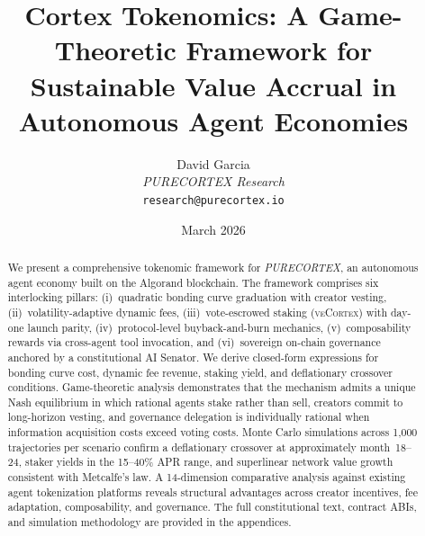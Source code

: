 \documentclass[11pt,letterpaper]{article}
\title{\textbf{Cortex Tokenomics: A Game-Theoretic Framework for\\
Sustainable Value Accrual in Autonomous Agent Economies}}
\author{David Garcia\\
\textit{PURECORTEX Research}\\
\texttt{research@purecortex.io}}
\date{March 2026}
\theoremstyle{definition}
\theoremstyle{remark}
\newcommand{\veCORTEX}{\textsc{veCortex}}
\begin{document}
\maketitle

\begin{abstract}
We present a comprehensive tokenomic framework for \emph{PURECORTEX}, an
autonomous agent economy built on the Algorand blockchain. The framework
comprises six interlocking pillars: (i)~quadratic bonding curve graduation
with creator vesting, (ii)~volatility-adaptive dynamic fees,
(iii)~vote-escrowed staking (\veCORTEX{}) with day-one launch parity,
(iv)~protocol-level buyback-and-burn mechanics, (v)~composability rewards
via cross-agent tool invocation, and (vi)~sovereign on-chain governance
anchored by a constitutional AI Senator. We derive closed-form expressions
for bonding curve cost, dynamic fee revenue, staking yield, and deflationary
crossover conditions. Game-theoretic analysis demonstrates that the mechanism
admits a unique Nash equilibrium in which rational agents stake rather than
sell, creators commit to long-horizon vesting, and governance delegation is
individually rational when information acquisition costs exceed voting costs.
Monte Carlo simulations across 1{,}000 trajectories per scenario confirm a
deflationary crossover at approximately month~18--24, staker yields in the
15--40\% APR range, and superlinear network value growth consistent with
Metcalfe's law. A 14-dimension comparative analysis against existing agent
tokenization platforms reveals structural advantages across creator
incentives, fee adaptation, composability, and governance. The full
constitutional text, contract ABIs, and simulation methodology are provided
in the appendices.
\end{abstract}

\tableofcontents
\newpage
















\appendix







\end{document}

